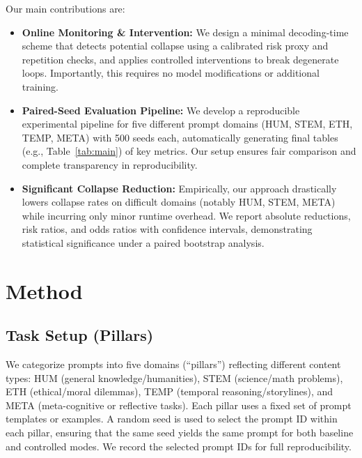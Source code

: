 \documentclass{article}
\begin{document}
Our main contributions are:
\begin{itemize}
  \item \textbf{Online Monitoring \& Intervention:} We design a minimal decoding-time scheme that detects potential collapse using a calibrated risk proxy and repetition checks, and applies controlled interventions to break degenerate loops. Importantly, this requires no model modifications or additional training.
  \item \textbf{Paired-Seed Evaluation Pipeline:} We develop a reproducible experimental pipeline for five different prompt domains (HUM, STEM, ETH, TEMP, META) with 500 seeds each, automatically generating final tables (e.g., Table~\ref{tab:main}) of key metrics. Our setup ensures fair comparison and complete transparency in reproducibility.
  \item \textbf{Significant Collapse Reduction:} Empirically, our approach drastically lowers collapse rates on difficult domains (notably HUM, STEM, META) while incurring only minor runtime overhead. We report absolute reductions, risk ratios, and odds ratios with confidence intervals, demonstrating statistical significance under a paired bootstrap analysis.
\end{itemize}

\section{Method}
\subsection{Task Setup (Pillars)}
We categorize prompts into five domains (``pillars'') reflecting different content types: HUM (general knowledge/humanities), STEM (science/math problems), ETH (ethical/moral dilemmas), TEMP (temporal reasoning/storylines), and META (meta-cognitive or reflective tasks). Each pillar uses a fixed set of prompt templates or examples. A random seed is used to select the prompt ID within each pillar, ensuring that the same seed yields the same prompt for both baseline and controlled modes. We record the selected prompt IDs for full reproducibility.
\end{document}
